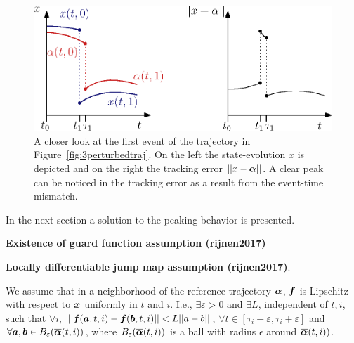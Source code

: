 \documentclass[../DC2017114Bouma.tex]{subfiles}
\begin{document}
\begin{figure}[h]
\centering
\includegraphics[width=.66\textwidth]{peakerror.eps}\caption{A closer look at the first event of the trajectory in Figure~\ref{fig:3perturbedtraj}. On the left the state-evolution $x$ is depicted and on the right the tracking error $||x-\boldsymbol{\alpha}||$. A clear peak can be noticed in the tracking error as a result from the event-time mismatch.} \label{fig:3peakerror}
\end{figure}

In the next section a solution to the peaking behavior is presented.

\textbf{Existence of guard function assumption (rijnen2017)}

\textbf{Locally differentiable jump map assumption (rijnen2017)}.

\begin{myass}
We assume that in a neighborhood of the reference trajectory $\boldsymbol{\alpha}$, ${\boldsymbol{f}}$ is Lipschitz with respect to ${\boldsymbol{x}}$ uniformly in $t$ and $i$. I.e., $\exists\varepsilon>0$ and $\exists L$, independent of $t,i$, such that $\forall i$, $||{\boldsymbol{f}}({\boldsymbol{a}},t,i) - {\boldsymbol{f}}({\boldsymbol{b}},t,i)||<L||a-b||$, $\forall t\in [\tau_i - \varepsilon,\tau_i + \varepsilon]$ and $\forall {\boldsymbol{a}},{\boldsymbol{b}}\in B_\varepsilon(\overline{\boldsymbol{\alpha}}(t,i))$, where $B_\varepsilon(\overline{\boldsymbol{\alpha}}(t,i))$ is a ball with radius $\epsilon$ around $\overline{\boldsymbol{\alpha}}(t,i))$.
\end{myass}


%
%
%
%
%
\end{document}
